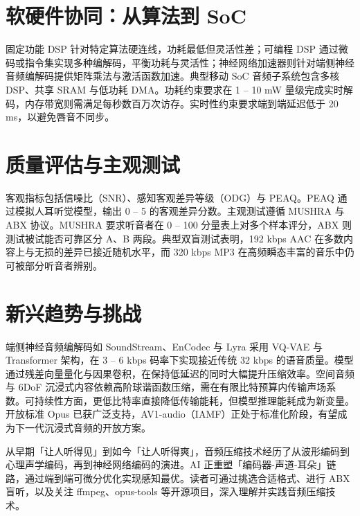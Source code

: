 \chapter{软硬件协同：从算法到 SoC}
固定功能 DSP 针对特定算法硬连线，功耗最低但灵活性差；可编程 DSP 通过微码或指令集实现多种编解码，平衡功耗与灵活性；神经网络加速器则针对端侧神经音频编解码提供矩阵乘法与激活函数加速。典型移动 SoC 音频子系统包含多核 DSP、共享 SRAM 与低功耗 DMA。功耗约束要求在 1 – 10 mW 量级完成实时解码，内存带宽则需满足每秒数百万次访存。实时性约束要求端到端延迟低于 20 ms，以避免唇音不同步。\par
\chapter{质量评估与主观测试}
客观指标包括信噪比（SNR）、感知客观差异等级（ODG）与 PEAQ。PEAQ 通过模拟人耳听觉模型，输出 0 – 5 的客观差异分数。主观测试遵循 MUSHRA 与 ABX 协议。MUSHRA 要求听音者在 0 – 100 分量表上对多个样本评分，ABX 则测试被试能否可靠区分 A、B 两段。典型双盲测试表明，192 kbps AAC 在多数内容上与无损的差异已接近随机水平，而 320 kbps MP3 在高频瞬态丰富的音乐中仍可被部分听音者辨别。\par
\chapter{新兴趋势与挑战}
端侧神经音频编解码如 SoundStream、EnCodec 与 Lyra 采用 VQ-VAE 与 Transformer 架构，在 3 – 6 kbps 码率下实现接近传统 32 kbps 的语音质量。模型通过残差向量量化与因果卷积，在保持低延迟的同时大幅提升压缩效率。空间音频与 6DoF 沉浸式内容依赖高阶球谐函数压缩，需在有限比特预算内传输声场系数。可持续性方面，更低比特率直接降低传输能耗，但模型推理能耗成为新变量。开放标准 Opus 已获广泛支持，AV1-audio（IAMF）正处于标准化阶段，有望成为下一代沉浸式音频的开放方案。\par
从早期「让人听得见」到如今「让人听得爽」，音频压缩技术经历了从波形编码到心理声学编码，再到神经网络编码的演进。AI 正重塑「编码器-声道-耳朵」链路，通过端到端可微分优化实现感知最优。读者可通过挑选合适格式、进行 ABX 盲听，以及关注 ffmpeg、opus-tools 等开源项目，深入理解并实践音频压缩技术。\par
